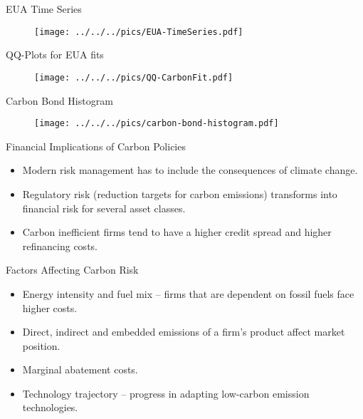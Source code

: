{EUA Time Series}
\begin{figure}[h!]
\centering
\texttt{[image: ../../../pics/EUA-TimeSeries.pdf]}
\label{fig:EUA-TS}
\end{figure}

{QQ-Plots for EUA fits}
\begin{figure}[h!]
\centering
\texttt{[image: ../../../pics/QQ-CarbonFit.pdf]}
\label{fig:EUA-fits}
\end{figure}

{Carbon Bond Histogram}
\begin{figure}[h!]
\centering
\texttt{[image: ../../../pics/carbon-bond-histogram.pdf]}
\label{fig:Carbon-Bond-Histogram}
\end{figure}


{Financial Implications of Carbon Policies}
\begin{itemize}
\item<1-> Modern risk management has to include the consequences of climate change.
\item<2-> Regulatory risk (reduction targets for carbon emissions) transforms into financial risk  for several asset classes.
\item<3-> Carbon inefficient firms tend to have a higher credit spread and higher refinancing costs.
\end{itemize}

{Factors Affecting Carbon Risk}
\begin{itemize}
\item<1-> Energy intensity and fuel mix -- firms that are dependent on fossil fuels face higher costs.
\item<2-> Direct, indirect and embedded emissions of a firm's product affect market position.
\item<3-> Marginal abatement costs.
\item<4-> Technology trajectory -- progress in adapting low-carbon emission technologies.
\end{itemize}


